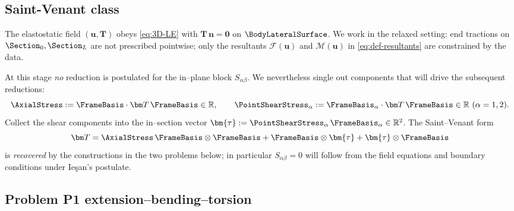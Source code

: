 

\subsection{Saint-Venant class}
The elastostatic field \((\bm u,\bm T)\) obeys \eqref{eq:3D-LE} with \(\bm T\,\bm n=\mathbf{0}\) on \(\BodyLateralSurface\).
We work in the relaxed setting: end tractions on \(\Section_0,\Section_L\) are not prescribed pointwise; only the resultants
\(\mathscr F(\bm u)\) and \(\mathscr M(\bm u)\) in \eqref{eq:def-resultants} are constrained by the data.

At this stage \emph{no} reduction is postulated for the in–plane block \(S_{\alpha\beta}\).
We nevertheless single out components that will drive the subsequent reductions:
\[
\AxialStress := \FrameBasis\cdot\bm T\,\FrameBasis \in \mathbb{R},
\qquad
\PointShearStress_\alpha := \FrameBasis_\alpha\cdot\bm T\,\FrameBasis \in \mathbb{R}\ (\alpha=1,2).
\]
Collect the shear components into the in–section vector \(\bm{\tau}:=\PointShearStress_\alpha\,\FrameBasis_\alpha\in\mathbb{R}^2\).
The Saint–Venant form
\begin{equation}
\bm T=\AxialStress\,\FrameBasis\otimes\FrameBasis+\FrameBasis\otimes\bm{\tau}+\bm{\tau}\otimes\FrameBasis
\label{eq:saint-venant-stress}
\end{equation}
is \emph{recovered} by the constructions in the two problems below; in particular \(S_{\alpha\beta}=0\) will follow from the field equations and boundary conditions under Ie\c{s}an’s postulate.


\subsection{Problem P1 extension--bending--torsion}

